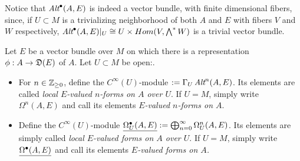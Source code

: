 Notice that $\operatorname{\textit{Alt}}^\bullet(A, E)$ is indeed a vector bundle, with finite dimensional fibers, since, if $U \subset M$ is a trivializing neighborhood of both $A$ and $E$ with fibers $V$ and $W$ respectively, $\operatorname{\textit{Alt}}^\bullet(A, E)|_U \cong U \times Hom(V, \bigwedge^* W)$ is a trivial vector bundle.

\begin{definition}
Let $E$ be a vector bundle over $M$ on which there is a representation $\phi: A \to \alg D(E)$ of $A$. Let $U \subset M$ be open:.

    \begin{itemize}
    
    \item For $n \in \mathbb{Z}_{\geq 0}$, define the $C^\infty(U)$-module \emph{}$:= \Gamma_U\operatorname{\textit{Alt}}^n(A, E)$. Its elements are called \emph{local $E$-valued $n$-forms on $A$ over $U$}. If $U = M$, simply write \emph{$\Omega^n(A, E)$} and call its elements \emph{$E$-valued $n$-forms on $A$}.
    
    \item Define the $C^\infty(U)$-module $\emph{\Omega_U^\bullet(A, E)} := \bigoplus^\infty_{n = 0} \Omega_U^n(A, E)$. Its elements are simply called \emph{local $E$-valued forms on $A$ over $U$}. If $U = M$, simply write $\emph{\Omega^\bullet(A, E)}$ and call its elements \emph{$E$-valued forms on $A$.}
    
    
        
    \end{itemize}
    
\end{definition}

